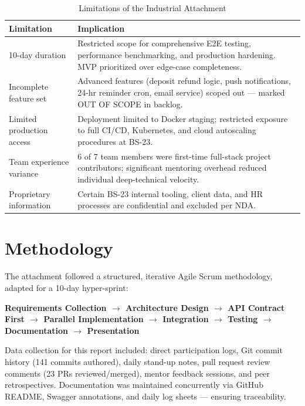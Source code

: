 \begin{table}[H]
\centering
\caption{Limitations of the Industrial Attachment}
\label{tab:limitations}
\begin{tabularx}{\textwidth}{@{}p{}X@{}}
\toprule
\textbf{Limitation} & \textbf{Implication} \\
\midrule
10-day duration & Restricted scope for comprehensive E2E testing, performance benchmarking, and production hardening. MVP prioritized over edge-case completeness. \\
Incomplete feature set & Advanced features (deposit refund logic, push notifications, 24-hr reminder cron, email service) scoped out --- marked OUT OF SCOPE in backlog. \\
Limited production access & Deployment limited to Docker staging; restricted exposure to full CI/CD, Kubernetes, and cloud autoscaling procedures at BS-23. \\
Team experience variance & 6 of 7 team members were first-time full-stack project contributors; significant mentoring overhead reduced individual deep-technical velocity. \\
Proprietary information & Certain BS-23 internal tooling, client data, and HR processes are confidential and excluded per NDA. \\
\bottomrule
\end{tabularx}
\end{table}

\section{Methodology}
\label{sec:methodology}

The attachment followed a structured, iterative Agile Scrum methodology, adapted for a 10-day hyper-sprint:

\textbf{Requirements Collection $\rightarrow$ Architecture Design $\rightarrow$ API Contract First $\rightarrow$ Parallel Implementation $\rightarrow$ Integration $\rightarrow$ Testing $\rightarrow$ Documentation $\rightarrow$ Presentation}

Data collection for this report included: direct participation logs, Git commit history (141 commits authored), daily stand-up notes, pull request review comments (23 PRs reviewed/merged), mentor feedback sessions, and peer retrospectives. Documentation was maintained concurrently via GitHub README, Swagger annotations, and daily log sheets --- ensuring traceability.

